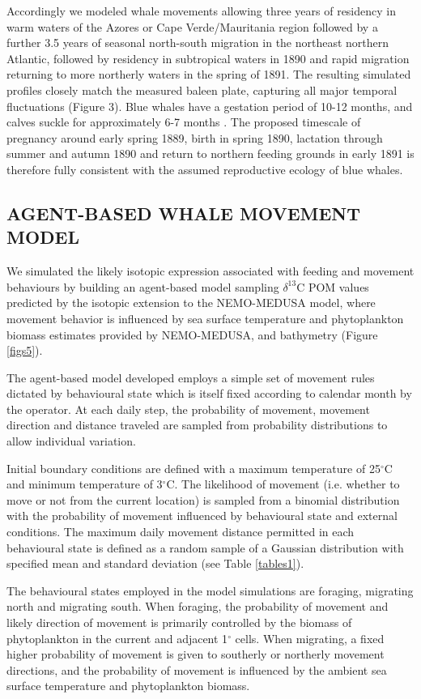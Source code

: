 \documentclass[a4paper,12pt]{article}
\begin{document}
Accordingly we modeled whale movements allowing three years of residency in warm waters of the Azores or Cape Verde/Mauritania region followed by a further 3.5 years of seasonal north-south migration in the northeast northern Atlantic, followed by residency in subtropical waters in 1890 and rapid migration returning to more northerly waters in the spring of 1891. 
The resulting simulated profiles closely match the measured baleen plate, capturing all major temporal fluctuations (Figure 3). 
Blue whales have a gestation period of 10-12 months, and calves suckle for approximately 6-7 months \cite{handbook}. 
The proposed timescale of pregnancy around early spring 1889, birth in spring 1890, lactation through summer and autumn 1890 and return to northern feeding grounds in early 1891 is therefore fully consistent with the assumed reproductive ecology of blue whales.

\subsection*{AGENT-BASED WHALE MOVEMENT MODEL}
We simulated the likely isotopic expression associated with feeding and movement behaviours by building an agent-based model sampling $\delta^{13}$C POM values predicted by the isotopic extension to the NEMO-MEDUSA model\cite{magozzi2017using,yool2013medusa}, where movement behavior is influenced by sea surface temperature and phytoplankton biomass estimates provided by NEMO-MEDUSA\cite{yool2013medusa}, and bathymetry (Figure \ref{figs5}).
 
The agent-based model developed employs a simple set of movement rules dictated by behavioural state which is itself fixed according to calendar month by the operator. 
At each daily step, the probability of movement, movement direction and distance traveled are sampled from probability distributions to allow individual variation.

Initial boundary conditions are defined with a maximum temperature of 25$^{\circ}$C and minimum temperature of 3$^{\circ}$C. 
The likelihood of movement (i.e. whether to move or not from the current location) is sampled from a binomial distribution with the probability of movement influenced by behavioural state and external conditions. 
The maximum daily movement distance permitted in each behavioural state is defined as a random sample of a Gaussian distribution with specified mean and standard deviation (see Table \ref{tables1}).
 
The behavioural states employed in the model simulations are foraging, migrating north and migrating south. 
When foraging, the probability of movement and likely direction of movement is primarily controlled by the biomass of phytoplankton in the current and adjacent 1$^{\circ}$ cells. 
When migrating, a fixed higher probability of movement is given to southerly or northerly movement directions, and the probability of movement is influenced by the ambient sea surface temperature and phytoplankton biomass.
 
\end{document}
